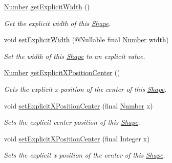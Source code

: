\begin{DoxyCompactItemize}
\hyperlink{interfacecom_1_1aarrelaakso_1_1drawl_1_1_number}{Number} \hyperlink{classcom_1_1aarrelaakso_1_1drawl_1_1_shape_aca08f18bbe102a5cf6a77cb746d42875}{get\+Explicit\+Width} ()
\begin{DoxyCompactList}\small\item\em Get the explicit width of this \hyperlink{classcom_1_1aarrelaakso_1_1drawl_1_1_shape}{Shape}. \end{DoxyCompactList}\item 
void \hyperlink{classcom_1_1aarrelaakso_1_1drawl_1_1_shape_a386685477bfc007aab782565f140265d}{set\+Explicit\+Width} (@Nullable final \hyperlink{interfacecom_1_1aarrelaakso_1_1drawl_1_1_number}{Number} width)
\begin{DoxyCompactList}\small\item\em Set the width of this \hyperlink{classcom_1_1aarrelaakso_1_1drawl_1_1_shape}{Shape} to an explicit value. \end{DoxyCompactList}\item 
\hyperlink{interfacecom_1_1aarrelaakso_1_1drawl_1_1_number}{Number} \hyperlink{classcom_1_1aarrelaakso_1_1drawl_1_1_shape_aa1fbd5a290bc5d2df437f0bd79f30a89}{get\+Explicit\+X\+Position\+Center} ()
\begin{DoxyCompactList}\small\item\em Gets the explicit x-\/position of the center of this \hyperlink{classcom_1_1aarrelaakso_1_1drawl_1_1_shape}{Shape}. \end{DoxyCompactList}\item 
void \hyperlink{classcom_1_1aarrelaakso_1_1drawl_1_1_shape_a28c766b414be0cd8767093f9be557dbd}{set\+Explicit\+X\+Position\+Center} (final \hyperlink{interfacecom_1_1aarrelaakso_1_1drawl_1_1_number}{Number} x)
\begin{DoxyCompactList}\small\item\em Sets the explicit center position of this \hyperlink{classcom_1_1aarrelaakso_1_1drawl_1_1_shape}{Shape}. \end{DoxyCompactList}\item 
void \hyperlink{classcom_1_1aarrelaakso_1_1drawl_1_1_shape_a271cd9377952616a30a434b22e22000a}{set\+Explicit\+X\+Position\+Center} (final Integer x)
\begin{DoxyCompactList}\small\item\em Sets the explicit x position of the center of this \hyperlink{classcom_1_1aarrelaakso_1_1drawl_1_1_shape}{Shape}. \end{DoxyCompactList}\item 

\end{DoxyCompactItemize}

